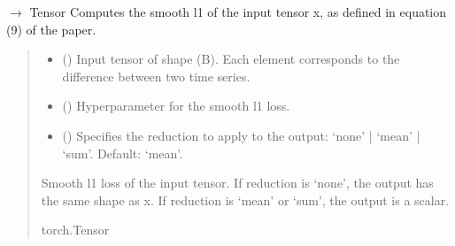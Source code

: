 \documentclass[letterpaper,10pt,english]{sphinxmanual}
\begin{document}
\begin{fulllineitems}
\label{\detokenize{dtw_loss_functions.otw:dtw_loss_functions.otw.smooth_l1_loss}}
\pysigstartsignatures
\pysiglinewithargsret
{}
{\sphinxparamcomma {}\sphinxparamcomma {}}
{{ $\rightarrow$ Tensor}}
\pysigstopsignatures
\sphinxAtStartPar
Computes the smooth l1 of the input tensor x, as defined in equation (9) of the paper.
\begin{quote}\begin{description}
\begin{itemize}
\item {} 
\sphinxAtStartPar
{} () \textendash{} Input tensor of shape (B). Each element corresponds to the difference between two time series.

\item {} 
\sphinxAtStartPar
{} () \textendash{} Hyperparameter for the smooth l1 loss.

\item {} 
\sphinxAtStartPar
{} () \textendash{} Specifies the reduction to apply to the output: ‘none’ | ‘mean’ | ‘sum’. Default: ‘mean’.

\end{itemize}

\sphinxAtStartPar
Smooth l1 loss of the input tensor. If reduction is ‘none’, the output has the same shape as x. If reduction is ‘mean’ or ‘sum’, the output is a scalar.

\sphinxAtStartPar
torch.Tensor

\end{description}\end{quote}

\end{fulllineitems}

\end{document}
